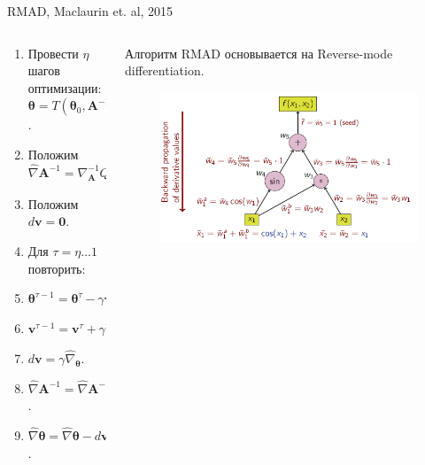 \documentclass[10pt,pdf,utf8,russian,aspectratio=169]{beamer}
\begin{document}
\begin{frame}{RMAD, Maclaurin et. al, 2015 }
\begin{columns}
\begin{column}{0.5\textwidth}
\begin{enumerate}
\item Провести $\eta$ шагов оптимизации: $\boldsymbol{\theta} = T(\boldsymbol{\theta}_0, \mathbf{A}^{-1})$.
\item Положим $\hat{\nabla} \mathbf{A}^{-1} = \nabla_\mathbf{A}^{-1} Q(\boldsymbol{\theta}, \mathbf{A}^{-1}).$ 
\item Положим $d\mathbf{v} = \mathbf{0}.$
\item Для $\tau = \eta \dots 1 $ повторить:
\item $\boldsymbol{\theta}^{\tau-1} =  \boldsymbol{\theta}^{\tau} - \gamma\mathbf{v}^{\tau}.$
\item $\mathbf{v}^{\tau-1} =\mathbf{v}^{\tau} + \gamma \hat{\nabla}_{\boldsymbol{\theta}}.$
\item $d\mathbf{v} =  \gamma \hat{\nabla}_{\boldsymbol{\theta}}$.
\item $\hat{\nabla} \mathbf{A}^{-1} =  \hat{\nabla} \mathbf{A}^{-1} - d\mathbf{v}\nabla_{\mathbf{A}^{-1}} \nabla_{\boldsymbol{\theta}} Q$.
\item $\hat{\nabla} \boldsymbol{\theta}  = \hat{\nabla} \boldsymbol{\theta}  - d\mathbf{v}\nabla_{\boldsymbol{\theta}} \nabla_{\boldsymbol{\theta}} Q$.
\end{enumerate}
\end{column}

\begin{column}{0.5\textwidth}
Алгоритм RMAD основывается на Reverse-mode differentiation.
\begin{figure}
\includegraphics[width=\textwidth]{rmd.png}
\end{figure}
\end{column}
\end{columns}
\end{frame}
\end{document}
